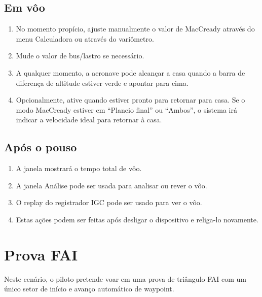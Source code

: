 \subsection*{Em vôo}
\begin{enumerate}
\item  No momento propício, ajuste manualmente o valor de MacCready através do menu Calculadora ou através do variômetro.
\item  Mude o valor de bus/lastro se necessário.
\item  A qualquer momento, a aeronave pode alcançar a casa quando a barra de diferença de altitude estiver verde e apontar para cima.
\item  Opcionalmente, ative   quando estiver pronto para retornar para casa.  Se o modo MacCready estiver em “Planeio final” ou “Ambos”, o sistema irá indicar a velocidade ideal para retornar à casa.
\end{enumerate}

\subsection*{Após o pouso}
\begin{enumerate}
\item  A janela  mostrará o tempo total de vôo. 
\item  A janela Análise pode ser usada para analisar ou rever o vôo.
\item  O replay do registrador IGC pode ser usado para ver o vôo.
\item  Estas ações podem ser feitas após desligar o dispositivo e religa-lo novamente.
\end{enumerate}

\section{Prova FAI}\label{sec:fai-task}

Neste cenário, o piloto pretende voar em uma prova de triângulo FAI com um único setor de início e avanço automático de waypoint.

